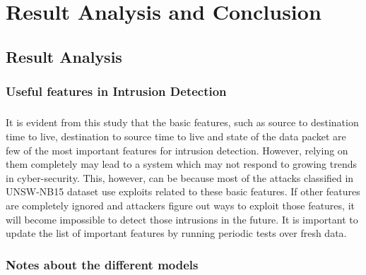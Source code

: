 \chapter{Result Analysis and Conclusion}

\section{Result Analysis}

\subsection{Useful features in Intrusion Detection}

\paragraph{}
It is evident from this study that the basic features, such as source to destination time to live, destination to source time to live and state of the data packet are few of the most important features for intrusion detection. However, relying on them completely may lead to a system which may not respond to growing trends in cyber-security. This, however, can be because most of the attacks classified in UNSW-NB15 dataset use exploits related to these basic features. If other features are completely ignored and attackers figure out ways to exploit those features, it will become impossible to detect those intrusions in the future. It is important to update the list of important features by running periodic tests over fresh data.

\subsection{Notes about the different models}

